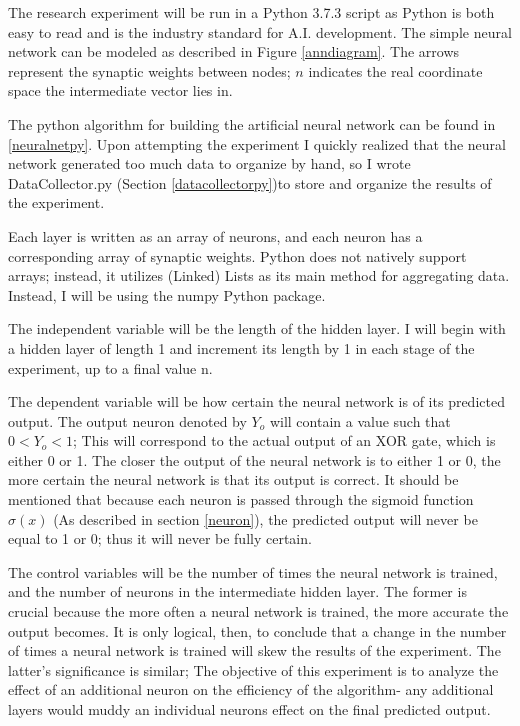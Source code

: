 \documentclass[12pt]{article}
\begin{document}
The research experiment will be run in a Python 3.7.3 script as Python is both easy to read and is the industry standard for A.I. development. The simple neural network can be modeled as described in Figure \ref{anndiagram}. The arrows represent the synaptic weights between nodes; \begin{math}n\end{math} indicates the real coordinate space the intermediate vector lies in.

The python algorithm for building the artificial neural network can be found in \ref{neuralnetpy}. Upon attempting the experiment I quickly realized that the neural network generated too much data to organize by hand, so I wrote DataCollector.py (Section \ref{datacollectorpy})to store and organize the results of the experiment.

Each layer is written as an array of neurons, and each neuron has a corresponding array of synaptic weights. Python does not natively support arrays; instead, it utilizes (Linked) Lists as its main method for aggregating data. Instead, I will be using the numpy Python package.

The independent variable will be the length of the hidden layer. I will begin with a hidden layer of length 1 and increment its length by 1 in each stage of the experiment, up to a final value n.

The dependent variable will be how certain the neural network is of its predicted output. The output neuron denoted by \({Y_o}\) will contain a value such that \(0 < Y_o < 1\); This will correspond to the actual output of an XOR gate, which is either 0 or 1. The closer the output of the neural network is to either 1 or 0, the more certain the neural network is that its output is correct. It should be mentioned that because each neuron is passed through the sigmoid function \(\sigma(x)\) (As described in section \ref{neuron}), the predicted output will never be equal to 1 or 0; thus it will never be fully certain.

The control variables will be the number of times the neural network is trained, and the number of neurons in the intermediate hidden layer. The former is crucial because the more often a neural network is trained, the more accurate the output becomes. It is only logical, then, to conclude that a change in the number of times a neural network is trained will skew the results of the experiment. The latter's significance is similar; The objective of this experiment is to analyze the effect of an additional neuron on the efficiency of the algorithm- any additional layers would muddy an individual neurons effect on the final predicted output.
\end{document}
